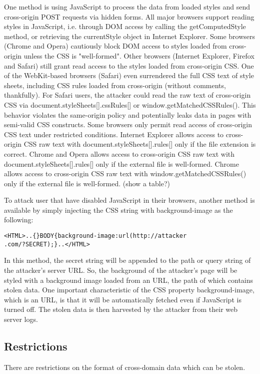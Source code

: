 \documentclass{acm_proc_article-sp}
\begin{document}
One method is using JavaScript to process the data from loaded styles and send cross-origin POST requests via hidden forms. All major browsers support reading styles in JavaScript, i.e. through DOM access by calling the getComputedStyle method, or retrieving the currentStyle object in Internet Explorer. Some browsers (Chrome and Opera) cautiously block DOM access to styles loaded from cross-origin unless the CSS is "well-formed". Other browsers (Internet Explorer, Firefox and Safari) still grant read access to the styles loaded from cross-origin CSS. One of the WebKit-based browsers (Safari) even surrendered the full CSS text of style sheets, including CSS rules loaded from cross-origin (without comments, thankfully). For Safari users, the attacker could read the raw text of cross-origin CSS via document.styleSheets[].cssRules[] or window.getMatchedCSSRules(). This behavior violates the same-origin policy and potentially leaks data in pages with semi-valid CSS constructs. Some browsers only permit read access of cross-origin CSS text under restricted conditions. Internet Explorer allows access to cross-origin CSS raw text with document.styleSheets[].rules[] only if the file extension is correct. Chrome and Opera allows access to cross-origin CSS raw text with document.styleSheets[].rules[] only if the external file is well-formed. Chrome allows access to cross-origin CSS raw text with window.getMatchedCSSRules() only if the external file is well-formed.
(show a table?)

To attack user that have disabled JavaScript in their browsers, another method is available by simply injecting the CSS string with background-image as the following:
\begin{verbatim}
<HTML>..{}BODY{background-image:url(http://attacker
.com/?SECRET);}..</HTML>
\end{verbatim}
In this method, the secret string will be appended to the path or query string of the attacker's server URL. So, the background of the attacker's page will be styled with a background image loaded from an URL, the path of which contains stolen data. One important characteristic of the CSS property background-image, which is an URL, is that it will be automatically fetched even if JavaScript is turned off. The stolen data is then harvested by the attacker from their web server logs.

\subsection{Restrictions}
There are restrictions on the format of cross-domain data which can be stolen.
\end{document}
